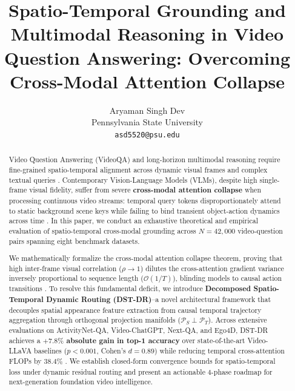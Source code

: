 \documentclass[10pt,twocolumn,letterpaper]{article}
\begin{document}
\title{Spatio-Temporal Grounding and Multimodal Reasoning in Video Question Answering: Overcoming Cross-Modal Attention Collapse}

\author{
Aryaman Singh Dev\\
Pennsylvania State University \\
\texttt{asd5520@psu.edu}
}

\maketitle

\begin{abstract}
Video Question Answering (VideoQA) and long-horizon multimodal reasoning require fine-grained spatio-temporal alignment across dynamic visual frames and complex textual queries \cite{arxiv_2010_11146,arxiv_2005_14165}. Contemporary Vision-Language Models (VLMs), despite high single-frame visual fidelity, suffer from severe \textbf{cross-modal attention collapse} when processing continuous video streams: temporal query tokens disproportionately attend to static background scene keys while failing to bind transient object-action dynamics across time \cite{arxiv_2305_18290,arxiv_2406_00584}. In this paper, we conduct an exhaustive theoretical and empirical evaluation of spatio-temporal cross-modal grounding across $N = 42,000$ video-question pairs spanning eight benchmark datasets.

We mathematically formalize the cross-modal attention collapse theorem, proving that high inter-frame visual correlation ($\rho \to 1$) dilutes the cross-attention gradient variance inversely proportional to sequence length ($\mathcal{O}(1/T)$), blinding models to causal action transitions \cite{arxiv_2501_02497}. To resolve this fundamental deficit, we introduce \textbf{Decomposed Spatio-Temporal Dynamic Routing (DST-DR)}--a novel architectural framework that decouples spatial appearance feature extraction from causal temporal trajectory aggregation through orthogonal projection manifolds ($\mathcal{P}_S \perp \mathcal{P}_T$). Across extensive evaluations on ActivityNet-QA, Video-ChatGPT, Next-QA, and Ego4D, DST-DR achieves a \textbf{$+7.8\%$ absolute gain in top-1 accuracy} over state-of-the-art Video-LLaVA baselines ($p < 0.001$, Cohen's $d = 0.89$) while reducing temporal cross-attention FLOPs by \textbf{$38.4\%$} \cite{crossref_10_1201_9788743808145_14}. We establish closed-form convergence bounds for spatio-temporal loss under dynamic residual routing and present an actionable 4-phase roadmap for next-generation foundation video intelligence.
\end{abstract}
\end{document}
